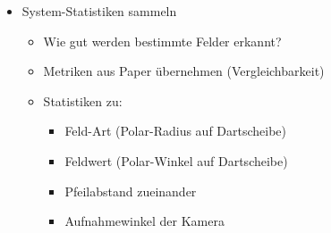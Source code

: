 \begin{itemize}
    \item System-Statistiken sammeln
    \begin{itemize}
        \item Wie gut werden bestimmte Felder erkannt?
        \item Metriken aus Paper übernehmen (Vergleichbarkeit)
        \item Statistiken zu:
        \begin{itemize}
            \item Feld-Art (Polar-Radius auf Dartscheibe)
            \item Feldwert (Polar-Winkel auf Dartscheibe)
            \item Pfeilabstand zueinander
            \item Aufnahmewinkel der Kamera
        \end{itemize}
    \end{itemize}
\end{itemize}
